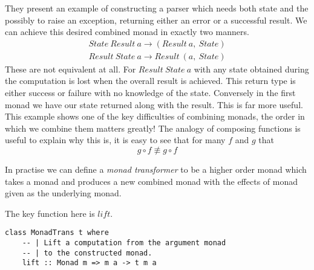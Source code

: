 They present an example of constructing a parser which needs both state
and the possibly to raise an exception,
returning either an error or a successful result.
We can achieve this desired combined monad in exactly two manners.
\begin{align}
    State\ Result\ a \rightarrow (Result\ a,\ State)\\
    Result\ State\ a \rightarrow Result\ (a,\ State)
\end{align}
These are not equivalent at all.
For $Result\ State\ a$ with any state obtained during the computation
is lost when the overall result is achieved.
This return type is either success or failure with no knowledge of the state.
Conversely in the first monad we have our state returned along with the result.
This is far more useful.
This example shows one of the key difficulties of combining monads,
the order in which we combine them matters greatly!
The analogy of composing functions is useful to explain why this is,
it is easy to see that for many $f$ and $g$ that
\begin{equation}
    g \circ f \not\equiv g \circ f
\end{equation}

In practise we can define a \textit{monad transformer}
to be a higher order monad which takes a monad
and produces a new combined monad with the effects of
monad given as the underlying monad.

The key function here is $lift$.
\begin{verbatim}
class MonadTrans t where
    -- | Lift a computation from the argument monad
    -- | to the constructed monad.
    lift :: Monad m => m a -> t m a

\end{verbatim}

